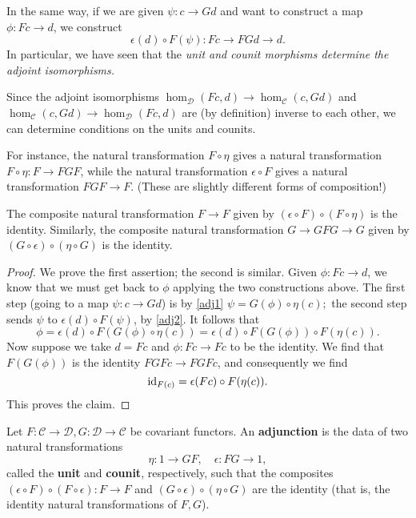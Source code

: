 In the same way, if we are given $\psi: c \to Gd$ and want to construct a map
$\phi: Fc \to d$, we construct
\begin{equation} \label{adj2} \epsilon(d) \circ  F(\psi): Fc \to FGd \to   d.
\end{equation}
In particular, we have seen that the \emph{unit and counit morphisms determine
the adjoint isomorphisms.}


Since the adjoint isomorphisms $\hom_{\mathcal{D}}(Fc, d) \to
\hom_{\mathcal{C}}(c, Gd)$ and 
$\hom_{\mathcal{C}}(c, Gd) \to \hom_{\mathcal{D}}(Fc, d) 
$
are (by definition) inverse to each other, we can determine
conditions on the units and counits.

For
instance, the natural transformation $F \circ \eta$ gives a natural
transformation $F \circ \eta: F \to FGF$, while the natural transformation
$\epsilon \circ F$ gives a natural transformation $FGF \to F$.
(These are slightly different forms of composition!)

\begin{lemma}  The composite natural transformation $F \to F$ given by
$(\epsilon \circ F) \circ (F \circ \eta)$ is the identity. 
Similarly, the composite natural transformation
$G \to GFG \to G$ given by $(G \circ \epsilon) \circ (\eta \circ G)$ is the
identity.
\end{lemma} 


\begin{proof} We prove the first assertion; the second is similar.
Given $\phi: Fc \to d$, we know that we must get back to $\phi$ applying the
two constructions above. The first step (going to a map $\psi: c \to Gd$) is by 
\eqref{adj1}
\( \psi = G(\phi) \circ \eta(c);  \) the second step sends $\psi$ to
$\epsilon(d) \circ F(\psi)$, by \eqref{adj2}.
It follows that
\[ \phi = \epsilon(d) \circ F( G(\phi) \circ \eta(c)) = \epsilon(d) \circ
F(G(\phi)) \circ F(\eta(c)). \]
Now suppose we take $d = Fc$ and $\phi: Fc \to Fc $ to be the identity.
We find that $F(G(\phi))$ is the identity $FGFc \to FGFc$, and consequently we
find
\[ \operatorname{id}_{F(c)} = \epsilon(Fc) \circ F(\eta(c)). \]
This proves the claim.
\end{proof} 



\begin{definition} 
Let $F: \mathcal{C} \to \mathcal{D}, G: \mathcal{D} \to \mathcal{C}$ be
covariant functors. An \textbf{adjunction} is the data of two natural
transformations
\[ \eta: 1 \to GF, \quad \epsilon: FG \to 1,  \]
called the \textbf{unit} and \textbf{counit}, respectively, such that the
composites $(\epsilon \circ F) \circ (F \circ \epsilon): F \to F$
and $(G \circ \epsilon) \circ (\eta \circ G)$ are the identity (that is, the
identity natural transformations of $F, G$).
\end{definition} 

